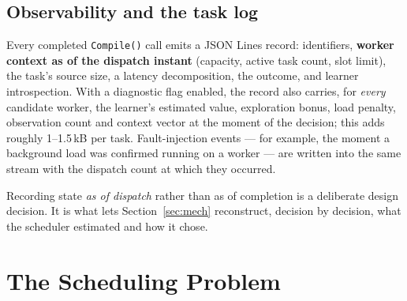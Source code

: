 \documentclass[final,5p,times,twocolumn]{elsarticle}
\begin{document}
\subsection{Observability and the task log}
\label{sec:log}

Every completed \texttt{Compile()} call emits a JSON Lines record: identifiers, \textbf{worker context as of the dispatch instant} (capacity, active task count, slot limit), the task's source size, a latency decomposition, the outcome, and learner introspection. With a diagnostic flag enabled, the record also carries, for \emph{every} candidate worker, the learner's estimated value, exploration bonus, load penalty, observation count and context vector at the moment of the decision; this adds roughly 1--1.5\,kB per task. Fault-injection events --- for example, the moment a background load was confirmed running on a worker --- are written into the same stream with the dispatch count at which they occurred.

Recording state \emph{as of dispatch} rather than as of completion is a deliberate design decision. It is what lets Section~\ref{sec:mech} reconstruct, decision by decision, what the scheduler estimated and how it chose.

\section{The Scheduling Problem}
\label{sec:problem}
\end{document}
